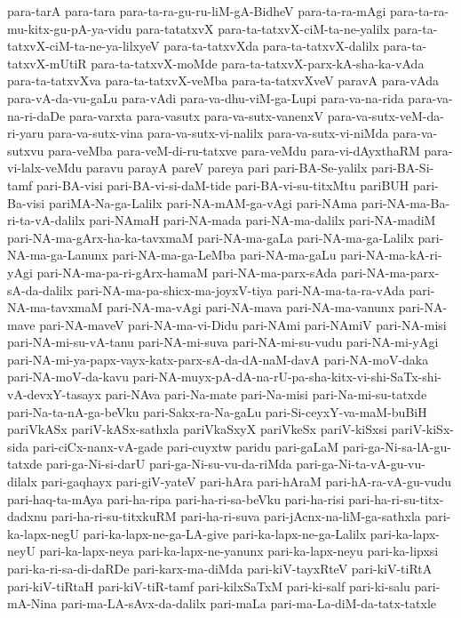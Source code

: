 {para-tarA
para-tara
para-ta-ra-gu-ru-liM-gA-BidheV
para-ta-ra-mAgi
para-ta-ra-mu-kitx-gu-pA-ya-vidu
para-tatatxvX
para-ta-tatxvX-ciM-ta-ne-yalilx
para-ta-tatxvX-ciM-ta-ne-ya-lilxyeV
para-ta-tatxvXda
para-ta-tatxvX-dalilx
para-ta-tatxvX-mUtiR
para-ta-tatxvX-moMde
para-ta-tatxvX-parx-kA-sha-ka-vAda
para-ta-tatxvXva
para-ta-tatxvX-veMba
para-ta-tatxvXveV
paravA
para-vAda
para-vA-da-vu-gaLu
para-vAdi
para-va-dhu-viM-ga-Lupi
para-va-na-rida
para-va-na-ri-daDe
para-varxta
para-vasutx
para-va-sutx-vanenxV
para-va-sutx-veM-da-ri-yaru
para-va-sutx-vina
para-va-sutx-vi-nalilx
para-va-sutx-vi-niMda
para-va-sutxvu
para-veMba
para-veM-di-ru-tatxve
para-veMdu
para-vi-dAyxthaRM
para-vi-lalx-veMdu
paravu
parayA
pareV
pareya
pari
pari-BA-Se-yalilx
pari-BA-Si-tamf
pari-BA-visi
pari-BA-vi-si-daM-tide
pari-BA-vi-su-titxMtu
pariBUH
pari-Ba-visi
pariMA-Na-ga-Lalilx
pari-NA-mAM-ga-vAgi
pari-NAma
pari-NA-ma-Ba-ri-ta-vA-dalilx
pari-NAmaH
pari-NA-mada
pari-NA-ma-dalilx
pari-NA-madiM
pari-NA-ma-gArx-ha-ka-tavxmaM
pari-NA-ma-gaLa
pari-NA-ma-ga-Lalilx
pari-NA-ma-ga-Lanunx
pari-NA-ma-ga-LeMba
pari-NA-ma-gaLu
pari-NA-ma-kA-ri-yAgi
pari-NA-ma-pa-ri-gArx-hamaM
pari-NA-ma-parx-sAda
pari-NA-ma-parx-sA-da-dalilx
pari-NA-ma-pa-shicx-ma-joyxV-tiya
pari-NA-ma-ta-ra-vAda
pari-NA-ma-tavxmaM
pari-NA-ma-vAgi
pari-NA-mava
pari-NA-ma-vanunx
pari-NA-mave
pari-NA-maveV
pari-NA-ma-vi-Didu
pari-NAmi
pari-NAmiV
pari-NA-misi
pari-NA-mi-su-vA-tanu
pari-NA-mi-suva
pari-NA-mi-su-vudu
pari-NA-mi-yAgi
pari-NA-mi-ya-papx-vayx-katx-parx-sA-da-dA-naM-davA
pari-NA-moV-daka
pari-NA-moV-da-kavu
pari-NA-muyx-pA-dA-na-rU-pa-sha-kitx-vi-shi-SaTx-shi-vA-devxY-tasayx
pari-NAva
pari-Na-mate
pari-Na-misi
pari-Na-mi-su-tatxde
pari-Na-ta-nA-ga-beVku
pari-Sakx-ra-Na-gaLu
pari-Si-ceyxY-va-maM-buBiH
pariVkASx
pariV-kASx-sathxla
pariVkaSxyX
pariVkeSx
pariV-kiSxsi
pariV-kiSx-sida
pari-ciCx-nanx-vA-gade
pari-cuyxtw
paridu
pari-gaLaM
pari-ga-Ni-sa-lA-gu-tatxde
pari-ga-Ni-si-darU
pari-ga-Ni-su-vu-da-riMda
pari-ga-Ni-ta-vA-gu-vu-dilalx
pari-gaqhayx
pari-giV-yateV
pari-hAra
pari-hAraM
pari-hA-ra-vA-gu-vudu
pari-haq-ta-mAya
pari-ha-ripa
pari-ha-ri-sa-beVku
pari-ha-risi
pari-ha-ri-su-titx-dadxnu
pari-ha-ri-su-titxkuRM
pari-ha-ri-suva
pari-jAcnx-na-liM-ga-sathxla
pari-ka-lapx-negU
pari-ka-lapx-ne-ga-LA-give
pari-ka-lapx-ne-ga-Lalilx
pari-ka-lapx-neyU
pari-ka-lapx-neya
pari-ka-lapx-ne-yanunx
pari-ka-lapx-neyu
pari-ka-lipxsi
pari-ka-ri-sa-di-daRDe
pari-karx-ma-diMda
pari-kiV-tayxRteV
pari-kiV-tiRtA
pari-kiV-tiRtaH
pari-kiV-tiR-tamf
pari-kilxSaTxM
pari-ki-salf
pari-ki-salu
pari-mA-Nina
pari-ma-LA-sAvx-da-dalilx
pari-maLa
pari-ma-La-diM-da-tatx-tatxle
}
